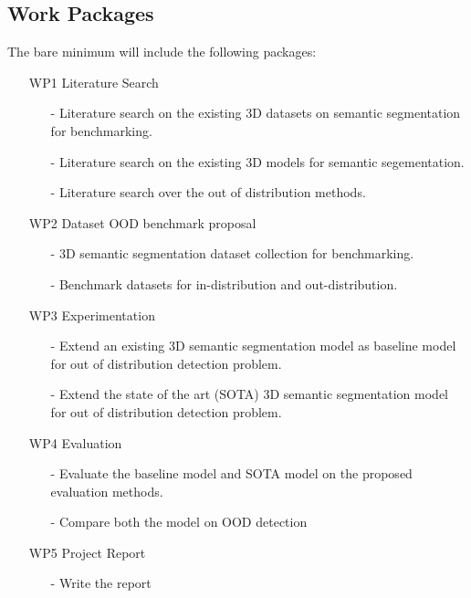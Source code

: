\documentclass[thesis]{mas_proposal}
\begin{document}
\subsection{Work Packages}
The bare minimum will include the following packages:
\begin{enumerate}
    \item[WP1] Literature Search
    \begin{itemize}
        \item[-] Literature search on the existing 3D datasets on semantic segmentation for benchmarking.
        \item[-] Literature search on the existing  3D models for semantic segementation.
        \item[-] Literature search over the out of distribution methods.
    \end{itemize} 
    \item[WP2] Dataset OOD benchmark proposal
    \begin{itemize}
        \item[-] 3D semantic segmentation dataset collection for benchmarking.
        \item[-] Benchmark datasets for in-distribution and out-distribution.
    \end{itemize}
    \item[WP3] Experimentation
    \begin{itemize}
        \item[-] Extend an existing 3D semantic segmentation model as baseline model for out of distribution detection problem.
        \item[-] Extend the state of the art (SOTA) 3D semantic segmentation model for out of distribution detection problem.
    \end{itemize}
    \item[WP4] Evaluation
    \begin{itemize}
        \item[-] Evaluate the baseline model and SOTA model on the proposed evaluation methods.
        \item[-] Compare both the model on OOD detection
    \end{itemize} 
    \item[WP5] Project Report
    \begin{itemize}
        \item[-] Write the report
    \end{itemize} 
\end{enumerate}
\end{document}
